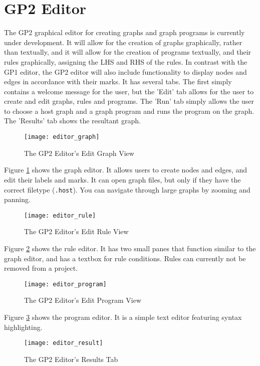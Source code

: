 \documentclass{UoYCSproject}
\begin{document}
\section{GP2 Editor}
The GP2 graphical editor for creating graphs and graph programs is currently under development. It will allow for the creation of graphs graphically, rather than textually, and it will allow for the creation of programs textually, and their rules graphically, assigning the LHS and RHS of the rules. In contrast with the GP1 editor, the GP2 editor will also include functionality to display nodes and edges in accordance with their marks. It has several tabs. The first simply contains a welcome message for the user, but the 'Edit' tab allows for the user to create and edit graphs, rules and programs. The 'Run' tab simply allows the user to choose a host graph and a graph program and runs the program on the graph. The 'Results' tab shows the resultant graph.

\begin{figure}
\label{img:editor_graph}
\texttt{[image: editor\_graph]}
\caption{The GP2 Editor's Edit Graph View}
\end{figure}

Figure \ref{img:editor_graph} shows the graph editor. It allows users to create nodes and edges, and edit their labels and marks. It can open graph files, but only if they have the correct filetype (\texttt{.host}). You can navigate through large graphs by zooming and panning.

\begin{figure}
\label{img:editor_rule}
\texttt{[image: editor\_rule]}
\caption{The GP2 Editor's Edit Rule View}
\end{figure}

Figure \ref{img:editor_rule} shows the rule editor. It has two small panes that function similar to the graph editor, and has a textbox for rule conditions. Rules can currently not be removed from a project.

\begin{figure}
\label{img:editor_program}
\texttt{[image: editor\_program]}
\caption{The GP2 Editor's Edit Program View}
\end{figure}

Figure \ref{img:editor_program} shows the program editor. It is a simple text editor featuring syntax highlighting.

\begin{figure}
\label{img:editor_result}
\texttt{[image: editor\_result]}
\caption{The GP2 Editor's Results Tab}
\end{figure}
\end{document}
